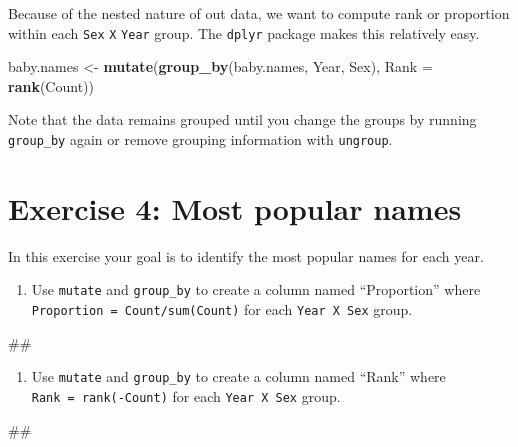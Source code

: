 \documentclass[]{book}
\newenvironment{Shaded}{\begin{snugshade}}{\end{snugshade}}
\newcommand{\KeywordTok}[1]{\textcolor[rgb]{0.13,0.29,0.53}{\textbf{#1}}}
\newcommand{\DataTypeTok}[1]{\textcolor[rgb]{0.13,0.29,0.53}{#1}}
\newcommand{\StringTok}[1]{\textcolor[rgb]{0.31,0.60,0.02}{#1}}
\newcommand{\NormalTok}[1]{#1}
\providecommand{\tightlist}{%
  \setlength{\itemsep}{0pt}\setlength{\parskip}{0pt}}
\begin{document}
Because of the nested nature of out data, we want to compute rank or
proportion within each \texttt{Sex} \texttt{X} \texttt{Year} group. The
\texttt{dplyr} package makes this relatively easy.

\begin{Shaded}
\begin{Highlighting}[]
\NormalTok{baby.names <-}\StringTok{ }\KeywordTok{mutate}\NormalTok{(}\KeywordTok{group_by}\NormalTok{(baby.names, Year, Sex),}
                     \DataTypeTok{Rank =} \KeywordTok{rank}\NormalTok{(Count))}
\end{Highlighting}
\end{Shaded}

Note that the data remains grouped until you change the groups by
running \texttt{group\_by} again or remove grouping information with
\texttt{ungroup}.

\section{Exercise 4: Most popular
names}\label{exercise-4-most-popular-names}

In this exercise your goal is to identify the most popular names for
each year.

\begin{enumerate}
\def\labelenumi{\arabic{enumi}.}
\tightlist
\item
  Use \texttt{mutate} and \texttt{group\_by} to create a column named
  ``Proportion'' where \texttt{Proportion\ =\ Count/sum(Count)} for each
  \texttt{Year\ X\ Sex} group.
\end{enumerate}

\begin{Shaded}
\begin{Highlighting}[]
\NormalTok{##}
\end{Highlighting}
\end{Shaded}

\begin{enumerate}
\def\labelenumi{\arabic{enumi}.}
\setcounter{enumi}{1}
\tightlist
\item
  Use \texttt{mutate} and \texttt{group\_by} to create a column named
  ``Rank'' where \texttt{Rank\ =\ rank(-Count)} for each
  \texttt{Year\ X\ Sex} group.
\end{enumerate}

\begin{Shaded}
\begin{Highlighting}[]
\NormalTok{##}
\end{Highlighting}
\end{Shaded}
\end{document}
